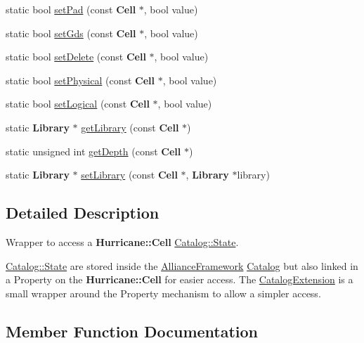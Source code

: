 \begin{DoxyCompactItemize}
static bool \mbox{\hyperlink{classCRL_1_1CatalogExtension_afceda0d184ed2964e160b563a216bc35}{set\+Pad}} (const \textbf{ Cell} $\ast$, bool value)
\item 
static bool \mbox{\hyperlink{classCRL_1_1CatalogExtension_a6c440bfd5ac56c9e07213c1347f0610a}{set\+Gds}} (const \textbf{ Cell} $\ast$, bool value)
\item 
static bool \mbox{\hyperlink{classCRL_1_1CatalogExtension_a8a5bdbfb8c898f8ea00c8718c6714983}{set\+Delete}} (const \textbf{ Cell} $\ast$, bool value)
\item 
static bool \mbox{\hyperlink{classCRL_1_1CatalogExtension_ae3de9795e0ddce5a767cf53d79fec077}{set\+Physical}} (const \textbf{ Cell} $\ast$, bool value)
\item 
static bool \mbox{\hyperlink{classCRL_1_1CatalogExtension_a9609c756887f433fe9b250e32ff1ae0a}{set\+Logical}} (const \textbf{ Cell} $\ast$, bool value)
\item 
static \textbf{ Library} $\ast$ \mbox{\hyperlink{classCRL_1_1CatalogExtension_a6681f9fbe64998a27fe532fd3591afc7}{get\+Library}} (const \textbf{ Cell} $\ast$)
\item 
static unsigned int \mbox{\hyperlink{classCRL_1_1CatalogExtension_ae4f8d30cf08796b62422546c05526d86}{get\+Depth}} (const \textbf{ Cell} $\ast$)
\item 
static \textbf{ Library} $\ast$ \mbox{\hyperlink{classCRL_1_1CatalogExtension_a6ef1b96f9bbbe39e13a5aba073f2394c}{set\+Library}} (const \textbf{ Cell} $\ast$, \textbf{ Library} $\ast$library)
\end{DoxyCompactItemize}


\subsection{Detailed Description}
Wrapper to access a \textbf{ Hurricane\+::\+Cell} \mbox{\hyperlink{classCRL_1_1Catalog_1_1State}{Catalog\+::\+State}}. 

\mbox{\hyperlink{classCRL_1_1Catalog_1_1State}{Catalog\+::\+State}} are stored inside the \mbox{\hyperlink{classCRL_1_1AllianceFramework}{Alliance\+Framework}} \mbox{\hyperlink{classCRL_1_1Catalog}{Catalog}} but also linked in a Property on the \textbf{ Hurricane\+::\+Cell} for easier access. The \mbox{\hyperlink{classCRL_1_1CatalogExtension}{Catalog\+Extension}} is a small wrapper around the Property mechanism to allow a simpler access. 

\subsection{Member Function Documentation}
\mbox{\label{classCRL_1_1CatalogExtension_a5feda5d6fba490a71e3742361ec7b4a1}} 
